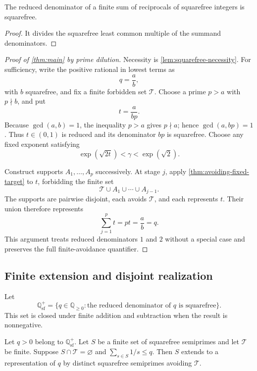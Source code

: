 \begin{lemma}
\label{lem:squarefree-necessity}
The reduced denominator of a finite sum of reciprocals of squarefree integers is squarefree.
\end{lemma}

\begin{proof}
It divides the squarefree least common multiple of the summand denominators.
\end{proof}

\begin{proof}[Proof of \cref{thm:main} by prime dilution]
Necessity is \cref{lem:squarefree-necessity}.  For sufficiency, write the positive rational in lowest terms as
\[
 q=\frac ab,
\]
with $b$ squarefree, and fix a finite forbidden set $\mathcal T$.  Choose a prime $p>a$ with $p\nmid b$, and put
\[
 t=\frac{a}{bp}.
\]
Because $\gcd(a,b)=1$, the inequality $p>a$ gives $p\nmid a$; hence $\gcd(a,bp)=1$.  Thus $t\in(0,1)$ is reduced and its denominator $bp$ is squarefree.  Choose any fixed exponent satisfying
\[
 \exp(\sqrt{2t})<\gamma<\exp(\sqrt2).
\]

Construct supports $A_1,\ldots,A_p$ successively.  At stage $j$, apply \cref{thm:avoiding-fixed-target} to $t$, forbidding the finite set
\[
 \mathcal T\cup A_1\cup\cdots\cup A_{j-1}.
\]
The supports are pairwise disjoint, each avoids $\mathcal T$, and each represents $t$.  Their union therefore represents
\[
 \sum_{j=1}^p t=pt=\frac ab=q.
\]
This argument treats reduced denominators $1$ and $2$ without a special case and preserves the full finite-avoidance quantifier.
\end{proof}

\subsection{Finite extension and disjoint realization}

Let
\[
 \mathbb Q_{\mathrm{sf}}^+
 =\{q\in\mathbb Q_{\geq0}:\text{the reduced denominator of $q$ is squarefree}\}.
\]
This set is closed under finite addition and subtraction when the result is nonnegative.

\begin{theorem}
\label{thm:finite-extension}
Let $q>0$ belong to $\mathbb Q_{\mathrm{sf}}^+$.  Let $S$ be a finite set of squarefree semiprimes and let $\mathcal T$ be finite.  Suppose $S\cap\mathcal T=\varnothing$ and $\sum_{s\in S}1/s\leq q$.  Then $S$ extends to a representation of $q$ by distinct squarefree semiprimes avoiding $\mathcal T$.
\end{theorem}

